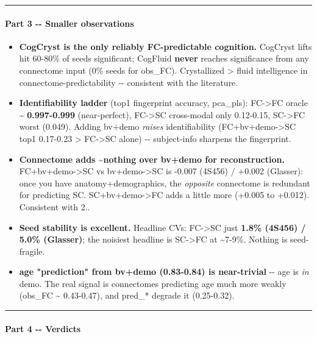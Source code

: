 \begin{center}\rule{0.5\linewidth}{0.5pt}\end{center}

\paragraph{Part 3 -\/- Smaller observations}\label{part-3----smaller-observations}

\begin{itemize}
\tightlist
\item
  \textbf{CogCryst is the only reliably FC-predictable cognition.} CogCryst lifts hit 60-80\% of seeds significant; CogFluid \textbf{never} reaches significance from any connectome input (0\% seeds for obs\_FC). Crystallized \textgreater{} fluid intelligence in connectome-predictability -\/- consistent with the literature.
\item
  \textbf{Identifiability ladder} (top1 fingerprint accuracy, pca\_pls): FC-\textgreater FC oracle \textasciitilde{} \textbf{0.997-0.999} (near-perfect), FC-\textgreater SC cross-modal only 0.12-0.15, SC-\textgreater FC worst (0.049). Adding bv+demo \emph{raises} identifiability (FC+bv+demo-\textgreater SC top1 0.17-0.23 \textgreater{} FC-\textgreater SC alone) -\/- subject-info sharpens the fingerprint.
\item
  \textbf{Connectome adds \textasciitilde nothing over bv+demo for reconstruction.} FC+bv+demo-\textgreater SC vs bv+demo-\textgreater SC is -0.007 (4S456) / +0.002 (Glasser): once you have anatomy+demographics, the \emph{opposite} connectome is redundant for predicting SC. SC+bv+demo-\textgreater FC adds a little more (+0.005 to +0.012). Consistent with 2..
\item
  \textbf{Seed stability is excellent.} Headline CVs: FC-\textgreater SC just \textbf{1.8\% (4S456) / 5.0\% (Glasser)}; the noisiest headline is SC-\textgreater FC at \textasciitilde7-9\%. Nothing is seed-fragile.
\item
  \textbf{age "prediction" from bv+demo (0.83-0.84) is near-trivial} -\/- age is \emph{in} demo. The real signal is connectomes predicting age much more weakly (obs\_FC \textasciitilde{} 0.43-0.47), and pred\_* degrade it (0.25-0.32).
\end{itemize}

\begin{center}\rule{0.5\linewidth}{0.5pt}\end{center}

\paragraph{Part 4 -\/- Verdicts}\label{part-4----verdicts}

